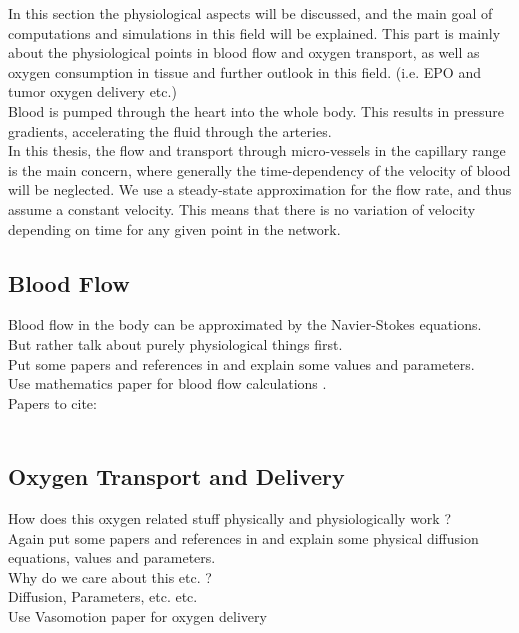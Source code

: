 In this section the physiological aspects will be discussed, and the main goal of computations and simulations in this field will be explained. This part is mainly about the physiological points in blood flow and oxygen transport, as well as oxygen consumption in tissue and further outlook in this field. (i.e. EPO and tumor oxygen delivery etc.)
\\Blood is pumped through the heart into the whole body. This results in pressure gradients, accelerating the fluid through the arteries.
\\In this thesis, the flow and transport through micro-vessels in the capillary range is the main concern, where generally the time-dependency of the velocity of blood will be neglected. We use a steady-state approximation for the flow rate, and thus assume a constant velocity. This means that there is no variation of velocity depending on time for any given point in the network.

\subsection{Blood Flow}

Blood flow in the body can be approximated by the Navier-Stokes equations.
\\But rather talk about purely physiological things first.
\\Put some papers and references in and explain some values and parameters.
\\Use mathematics paper for blood flow calculations \cite{rahman2012mathematical}.
\\Papers to cite: \cite{pittman2011regulation}
\\
\\

\subsection{Oxygen Transport and Delivery}

How does this oxygen related stuff physically and physiologically work ?
\\Again put some papers and references in and explain some physical diffusion equations, values and parameters.
\\Why do we care about this etc. ?
\\Diffusion, Parameters, etc. etc.
\\Use Vasomotion paper for oxygen delivery \cite{goldman2001computational}

